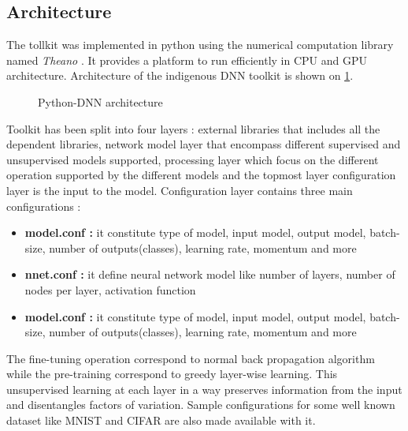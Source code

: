 \subsection{Architecture}
The tollkit was implemented in python using the numerical computation library named \textit{Theano} \citep{theano}.  It provides a platform to run efficiently in CPU and GPU architecture.  Architecture of the indigenous DNN toolkit is shown on \ref{fig:architecture}.
\begin{figure}[htpb]
   \begin{center}
   		{%
			\setlength{\fboxsep}{5pt}%
	    }%
     \caption {Python-DNN architecture}
	 \label{fig:architecture}
   \end{center}
 \end{figure}
Toolkit has been split into four layers : external libraries that includes all the dependent libraries, network model layer that encompass different supervised and unsupervised models supported, processing layer which focus on the different operation supported by the different models and the topmost layer configuration layer is the input to the model.  Configuration layer contains three main configurations : 
 \begin{itemize}
	\item {\textbf{model.conf :} it constitute type of model, input model, output model, batch-size, number of outputs(classes), learning rate, momentum and more}
	\item {\textbf{nnet.conf :} it define neural network model like number of layers, number of nodes per layer, activation function}
	\item {\textbf{model.conf :} it constitute type of model, input model, output model, batch-size, number of outputs(classes), learning rate, momentum and more}
 \end{itemize}
The fine-tuning operation correspond to normal back propagation algorithm while the pre-training correspond to greedy layer-wise learning.  This unsupervised learning at each layer in a way preserves information from the input and disentangles factors of variation.  Sample configurations for some well known dataset like MNIST and CIFAR are also made available with it.
